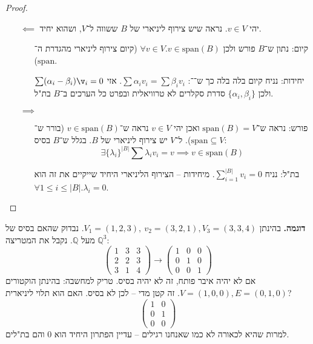 \documentclass[]{article}
\newcommand\Q     {\mathbb{Q}}
\newcommand\ap    {\alpha}
\begin{document}
	\begin{proof}\, 
		\begin{enumerate}
			\item[$\impliedby$] יהי $v \in V$. נראה שיש צירוף ליניארי של $B$ ששווה ל־$V$, ושהוא יחיד. 
			\begin{enumerate}
				\item[קיום:] נתון ש־$B$ פורש ולכן $\forall v \in V. v \in \mathrm{span}(B)$ (קיום צירוף ליניארי מהגדרת ה־$\mathrm{span}$). 
				\item[יחידות: ]נניח קיום בלה בלה כך ש־־: $\sum \alpha_i v_i = \sum \beta_i v_i$. אזי $\sum(\alpha_i - \beta_i)\v_i = 0$ ולכן $\{\ap_i, \beta_i\}$ סדרת סקלרים לא טרוויאלית ובפרט כל הערכים ב־$B$ בת"ל. 
			\end{enumerate}
			\item[$\implies$]\begin{enumerate}
				\item[פורש: ]נראה ש־$\mathrm{span}(B) = V$ ואכן יהי $v \in V$ נראה ש־$v \in \mathrm{span}(B)$ (בורר ש־$\mathrm{span} \subseteq V$). ל־$V$ יש צירוף ליניארי של $B$. בגלל ש־$B$ בסיס: 
				\[ \exists \{\lambda_i\}^{|B|} \sum \lambda_iv_i = v \implies v \in \mathrm{span}(B) \]
				\item[בת"ל: ]נניח $\sum^{|B|}_{i = 1}v_i = 0$. מיחידות – הצירוף הליניארי היחיד שייקיים את זה הוא $\forall 1 \le i \le |B|. \lambda_i = 0$. 
			\end{enumerate}
		\end{enumerate}
	\end{proof}
	
	\textbf{דוגמה. }בהינתן $V_1 = (1, 2, 3), \ v_2 = (3, 2, 1), V_3 = (3, 3, 4)$. נבדוק שהאם בסיס של $\Q^3$ מעל $\Q$. 
	נקבל את המטריצה: 
	\[ \begin{pmatrix}
		1 & 3 & 3 \\
		2 & 2 & 3 \\
		3 & 1 & 4
	\end{pmatrix} \to \begin{pmatrix}
	1 & 0 & 0 \\
	0 & 1 & 0\\
	0 & 0 & 1 
	\end{pmatrix} \]
	אם לא יהיה איבר פותח, זה לא יהיה בסיס. טריק למחשבה: בהינתן הוקטורים $V = (1, 0, 0), E = (0, 1, 0)$. זה קטן מדי – לכן לא בסיס. האם הוא תלוי ליניארית? 
	\[ \begin{pmatrix}
		1 & 0 \\
		0 & 1 \\
		0 & 0
	\end{pmatrix} \]
	למרות שהיא לכאורה לא כמו שאנחנו רגילים – עדיין הפתרון היחיד הוא $0$ והם בת"לים.
	
\end{document}
